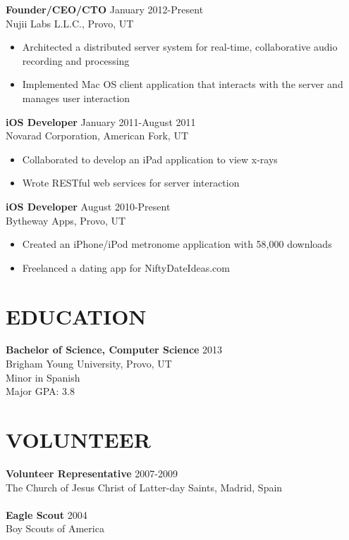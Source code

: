 \documentclass[margin]{res}
\begin{document}
\begin{resume}
      {\bf Founder/CEO/CTO} \hfill January 2012-Present \\
      Nujii Labs L.L.C., Provo, UT 
      \begin{itemize} \itemsep -2pt
        \item Architected a distributed server system for real-time, 
        collaborative audio recording and processing
        \item Implemented Mac OS client application that interacts 
        with the server and manages user interaction
      \end{itemize}

      {\bf iOS Developer} \hfill January 2011-August 2011 \\
      Novarad Corporation, American Fork, UT  
      \begin{itemize} \itemsep -2pt
        \item Collaborated to develop an iPad application to view x-rays
        \item Wrote RESTful web services for server interaction
      \end{itemize}

      {\bf iOS Developer} \hfill  August 2010-Present \\
      Bytheway Apps, Provo, UT
      \begin{itemize} \itemsep -2pt
        \item Created an iPhone/iPod metronome application with 58,000 downloads
        \item Freelanced a dating app for NiftyDateIdeas.com
      \end{itemize}

    \section{EDUCATION}
      {\bf Bachelor of Science, Computer Science} \hfill 2013 \\
      Brigham Young University, Provo, UT                 \\
      Minor in Spanish                                    \\
      Major GPA: 3.8

    \section{VOLUNTEER}
      {\bf Volunteer Representative} \hfill 2007-2009 \\
      The Church of Jesus Christ of Latter-day Saints, Madrid, Spain \\ \\
      {\bf Eagle Scout} \hfill 2004 \\
      Boy Scouts of America


\end{resume}
\end{document}
